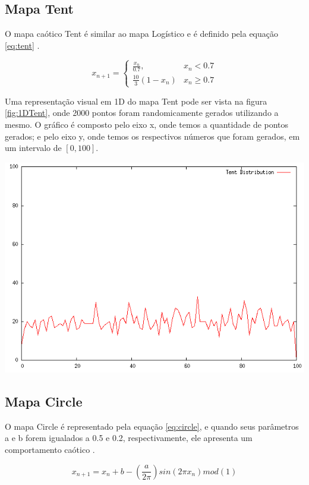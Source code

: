 \subsection{Mapa Tent}

O mapa caótico Tent é similar ao mapa Logístico e é definido pela equação \ref{eq:tent} \cite{gandomi}.

\begin{equation}
\label{eq:tent}
x_{n + 1} =
\begin{cases}
    \frac{x_{n}}{0.7}, & \text{$x_{n} < 0.7$} \\
    \frac{10}{3}(1-x_{n}) & \text{$x_{n} \geq 0.7$} 
\end{cases}
\end{equation}

Uma representação visual em 1D do mapa Tent pode ser vista na figura \ref{fig:1DTent}, onde 2000 pontos foram randomicamente gerados utilizando a mesmo. O gráfico é composto pelo eixo x, onde temos a quantidade de pontos gerados; e pelo eixo y, onde temos os respectivos números que foram gerados, em um intervalo de $[0, 100]$.

{
    \centering
    \includegraphics[width=0.6\linewidth]{figuras/DistribuicaoTent.png}
    \label{fig:1DTent}
}

\subsection{Mapa Circle}

O mapa Circle é representado pela equação \ref{eq:circle}, e quando seus parâmetros a e b forem igualados a 0.5 e 0.2, respectivamente, ele apresenta um comportamento caótico \cite{gandomi}.

\begin{equation}
\label{eq:circle}
x_{n + 1} = x_{n} + b - (\frac{a}{2\pi}) sin(2\pi x_{n})mod(1)
\end{equation}

